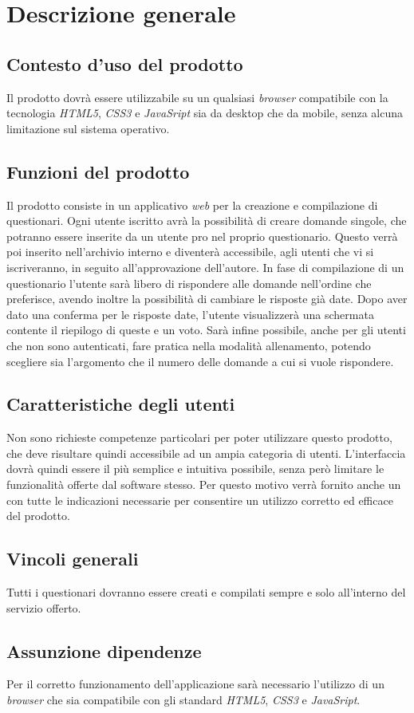 \newpage
\section{Descrizione generale}
\subsection{Contesto d'uso del prodotto}
Il prodotto dovrà essere utilizzabile su un qualsiasi \textit{browser} compatibile con la tecnologia \textit{HTML5}, \textit{CSS3} e \textit{JavaSript} sia da desktop che da mobile, senza alcuna limitazione sul sistema operativo.

\subsection{Funzioni del prodotto}
Il prodotto consiste in un applicativo \textit{web} per la creazione e compilazione di questionari. Ogni utente iscritto avrà la possibilità di creare domande singole, che potranno essere inserite da un utente pro nel proprio questionario. Questo verrà poi inserito nell'archivio interno e diventerà accessibile, agli utenti che vi si iscriveranno, in seguito all'approvazione dell'autore. In fase di compilazione di un questionario l'utente sarà libero di rispondere alle domande nell'ordine che preferisce, avendo inoltre la possibilità di cambiare le risposte già date. Dopo aver dato una conferma per le risposte date, l'utente visualizzerà una schermata contente il riepilogo di queste e un voto. Sarà infine possibile, anche per gli utenti che non sono autenticati, fare pratica nella modalità allenamento, potendo scegliere sia l'argomento che il numero delle domande a cui si vuole rispondere.

\subsection{Caratteristiche degli utenti}
Non sono richieste competenze particolari per poter utilizzare questo prodotto, che deve risultare quindi accessibile ad un ampia categoria di utenti. L'interfaccia dovrà quindi essere il più semplice e intuitiva possibile, senza però limitare le funzionalità offerte dal software stesso. Per questo motivo verrà fornito anche un \textit{\MU} con tutte le indicazioni necessarie per consentire un utilizzo corretto ed efficace del prodotto.
\subsection{Vincoli generali}
Tutti i questionari dovranno essere creati e compilati sempre e solo all'interno del servizio offerto.
\subsection{Assunzione dipendenze}
Per il corretto funzionamento dell'applicazione sarà necessario l'utilizzo di un \textit{browser} che sia compatibile con gli standard \textit{HTML5}, \textit{CSS3} e \textit{JavaSript}.